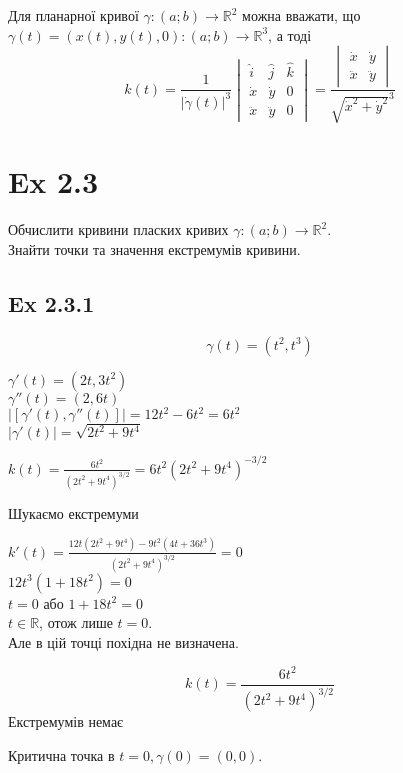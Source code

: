\documentclass[10pt, a4paper]{article} %
\newcommand{\R}{\mathbb{R}}
\begin{document}
Для планарної кривої $\gamma : (a;b) \to \R^2$ можна вважати, що $\gamma(t) = (x(t), y(t), 0) : (a;b) \to \R^3$, а тоді
\[k(t) = \frac{1}{|\dot\gamma(t)|^3} \begin{vmatrix}
    \hat i & \hat j & \hat k \\
    \dot x & \dot y & 0 \\
    \ddot x & \ddot y & 0
\end{vmatrix} = \frac{\begin{vmatrix}\dot x & \dot y \\ \ddot x & \ddot y \end{vmatrix}}{\sqrt{\dot x^2 + \dot y^2}^3}\]

\section*{Ex 2.3}
\begin{mdframed}
    Обчислити кривини пласких кривих $\gamma: (a;b) \to \R^2$.\\
    Знайти точки та значення екстремумів кривини.
\end{mdframed}

\subsection*{Ex 2.3.1}
\[\gamma(t) = (t^2, t^3)\]

$\gamma'(t) = (2t, 3t^2)$\\
$\gamma''(t) = (2, 6t)$\\
$|[\gamma'(t), \gamma''(t)]| = 12t^2 - 6t^2 = 6t^2$\\
$|\gamma'(t)| = \sqrt{2t^2+9t^4}$

$k(t) = \frac{6t^2}{(2t^2+9t^4)^{3/2}} = 6t^2(2t^2+9t^4)^{-3/2}$

Шукаємо екстремуми

$k'(t) = \frac{12t(2t^2+9t^4)-9t^2(4t+36t^3)}{(2t^2+9t^4)^{3/2}} = 0$\\
$12t^3(1+18t^2) = 0$\\
$t=0$ або $1+18t^2=0$\\
$t\in \R$, отож лише $t=0$.\\
Але в цій точці похідна не визначена.

\begin{mdframed}[backgroundcolor=green!20]
    \[k(t) = \frac{6t^2}{(2t^2+9t^4)^{3/2}}\]
    Екстремумів немає

    Критична точка в $t=0, \gamma(0) = (0,0)$.
\end{mdframed}
\end{document}
